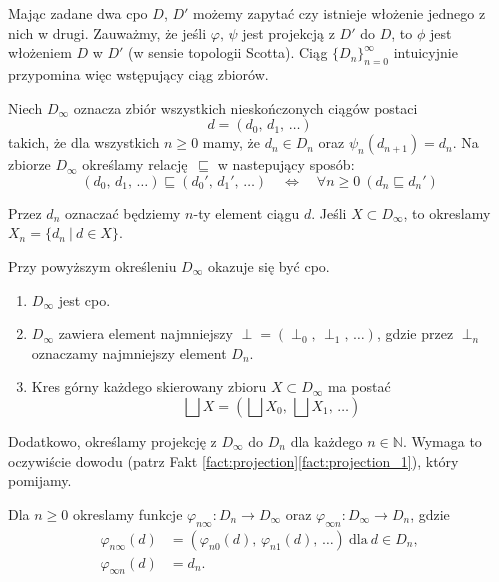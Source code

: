 Mając zadane dwa cpo \(D\), \(D'\) możemy zapytać czy istnieje włożenie jednego z nich w drugi. Zauważmy, że jeśli \(\varphi,\,\psi\) jest projekcją z \(D'\) do \(D\), to \(\phi\) jest włożeniem \(D\) w \(D'\) (w sensie topologii Scotta). Ciąg \(\{D_n\}_{n=0}^\infty\) intuicyjnie przypomina więc wstępujący ciąg zbiorów.


\begin{definicja}%
Niech \(D_\infty\) oznacza zbiór wszystkich nieskończonych ciągów postaci
\[
d=(d_0,\,d_1,\,\dots)
\]
takich, że dla wszystkich \(n\geq 0\) mamy, że \(d_n\in D_n\) oraz \(\psi_n (d_{n+1}) = d_n\). 
Na zbiorze \(D_\infty\) określamy relację \(\sqsubseteq\) w nastepujący sposób:
\[
(d_0,\,d_1,\,\dots) \sqsubseteq (d_0',\,d_1',\,\dots) \quad \Leftrightarrow\quad  \forall n\geq 0\  (d_n\sqsubseteq d_n') 
\]

  Przez \(d_n\) oznaczać będziemy \(n\)-ty element ciągu \(d\). Jeśli \(X\subset D_\infty\), to okreslamy \(X_n=\{ d_n\ |\ d\in X\}\).

\end{definicja}

Przy powyższym określeniu \(D_\infty\) okazuje się być cpo.

\begin{fakt}%
\begin{enumerate}[label={(\roman*)}, ref={(\roman*)}] 
  \setlength\itemsep{0em}
\item \(D_\infty\) jest cpo.
\item \(D_\infty\) zawiera element najmniejszy \(\perp=(\perp_0,\,\perp_1,\,\dots)\), gdzie przez \(\perp_n\) oznaczamy najmniejszy element \(D_n\).
\item Kres górny każdego skierowany zbioru \(X\subset D_\infty\) ma postać
\[
\bigsqcup X = (\bigsqcup X_0,\,\bigsqcup X_1,\,\dots)
\]
\end{enumerate}
\end{fakt}

Dodatkowo, określamy projekcję z \(D_\infty\) do \(D_n\) dla każdego \(n\in\mathbb{N}\).
Wymaga to oczywiście dowodu (patrz Fakt \ref{fact:projection}\ref{fact:projection_1}), który pomijamy.

\begin{definicja}[\(D_\infty\)]%
Dla \(n\geq 0\) okreslamy funkcje \(\varphi_{n\infty}:D_n\to D_\infty\) oraz \(\varphi_{\infty n}: D_\infty \to D_n\), gdzie 
\begin{align*}
\varphi_{n\infty}(d) &= (\varphi_{n0}(d),\,\varphi_{n1}(d),\,\dots)\ \text{dla}\ d\in D_n,\\
\varphi_{\infty n}(d) &= d_n.
\end{align*}
\end{definicja}

